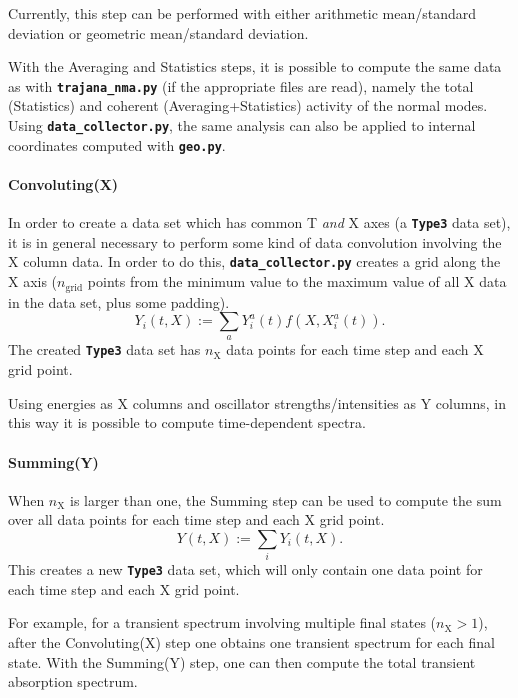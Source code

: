 \documentclass[a4paper,10pt,DIV=15,openany]{scrbook}
\newcommand{\todo}[1]{\textcolor{RL}{#1}}
\newcommand{\ttt}[1]{\textbf{\texttt{#1}}}
\begin{document}
Currently, this step can be performed with either arithmetic mean/standard deviation or geometric mean/standard deviation.

With the Averaging and Statistics steps, it is possible to compute the same data as with \ttt{trajana\_nma.py} (if the appropriate files are read), namely the total (Statistics) and coherent (Averaging+Statistics) activity of the normal modes.
Using \ttt{data\_collector.py}, the same analysis can also be applied to internal coordinates computed with \ttt{geo.py}.

\paragraph{Convoluting(X)}

In order to create a data set which has common T \emph{and} X axes (a \ttt{Type3} data set), it is in general necessary to perform some kind of data convolution involving the X column data.
In order to do this, \ttt{data\_collector.py} creates a grid along the X axis ($n_\text{grid}$ points from the minimum value to the maximum value of all X data in the data set, plus some padding).
\begin{equation}
  Y_i(t,X):=\sum_a Y_i^a(t) f(X,X_i^a(t)).
\end{equation}
The created \ttt{Type3} data set has $n_\text{X}$ data points for each time step and each X grid point.

Using energies as X columns and oscillator strengths/intensities as Y columns, in this way it is possible to compute time-dependent spectra.

\paragraph{Summing(Y)}

When $n_\text{X}$ is larger than one, the Summing step can be used to compute the sum over all data points for each time step and each X grid point.
\begin{equation}
  Y(t,X):=\sum_i Y_i(t,X).
\end{equation}
This creates a new \ttt{Type3} data set, which will only contain one data point for each time step and each X grid point.

For example, for a transient spectrum involving multiple final states ($n_\text{X}>1$), after the Convoluting(X) step one obtains one transient spectrum for each final state. With the Summing(Y) step, one can then compute the total transient absorption spectrum.
\end{document}
